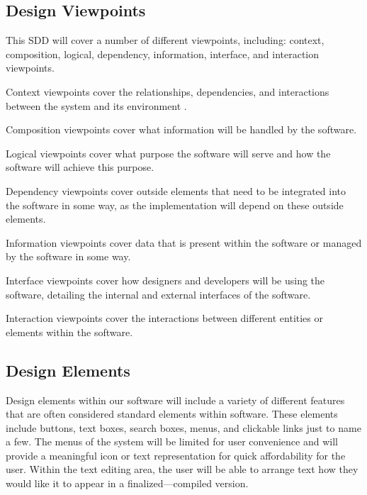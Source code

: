 \documentclass[onecolumn, draftclsnofoot,10pt, compsoc]{IEEEtran}
\begin{document}
\subsection{Design Viewpoints}
\noindent This SDD will cover a number of different viewpoints, including:
context, composition, logical, dependency, information, interface, 
and interaction viewpoints. \\

\medskip 

\noindent Context viewpoints cover the relationships, dependencies, and
interactions between the system and its environment \cite{viewpoints}. \\

\medskip 

\noindent Composition viewpoints cover what information will be handled 
by the software. \\

\medskip 

\noindent Logical viewpoints cover what purpose the software will serve 
and how the software will achieve this purpose. \\

\medskip 

\noindent Dependency viewpoints cover outside elements that need to 
be integrated into the software in some way, as the implementation will 
depend on these outside elements. \\

\medskip 

\noindent Information viewpoints cover data that is present within 
the software or managed by the software in some way. \\

\medskip 

\noindent Interface viewpoints cover how designers and developers will 
be using the software, detailing the internal and external interfaces of 
the software. \\

\medskip 

\noindent Interaction viewpoints cover the interactions between different entities or elements within the software. \\

\subsection{Design Elements}
\noindent Design elements within our software will include a variety 
of different features that are often considered standard elements 
within software. These elements include buttons, text boxes, search boxes, 
menus, and clickable links just to name a few. The menus of the system will be 
limited for user convenience and will provide a meaningful icon or text 
representation for quick affordability for the user. Within the text editing 
area, the user will be able to arrange text how they would like it to appear 
in a finalized---compiled version. \\
\end{document}
